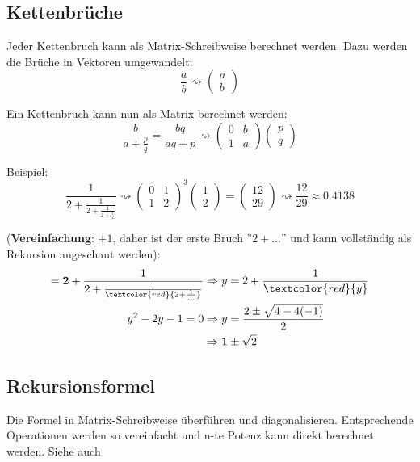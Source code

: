 \subsection{Kettenbrüche}
Jeder Kettenbruch kann als Matrix-Schreibweise berechnet werden. Dazu werden die Brüche in Vektoren umgewandelt:
\[
\frac{a}{b} \rightsquigarrow \begin{pmatrix} a \\ b \end{pmatrix}
\]

\noindent Ein Kettenbruch kann nun als Matrix berechnet werden:
\[
\frac{b}{a + \frac{p}{q}} = \frac{bq}{aq + p} \rightsquigarrow \begin{pmatrix}0 & b \\ 1 & a\end{pmatrix}\begin{pmatrix}p \\ q \end{pmatrix}
\]

\noindent Beispiel: 
\[
\frac{1}{2 + \frac{1}{2 + \frac{1}{2 + \frac{1}{2}}}} \rightsquigarrow
\begin{pmatrix}0 & 1 \\ 1 & 2 \end{pmatrix}^3\begin{pmatrix}1 \\ 2 \end{pmatrix} = \begin{pmatrix}12 \\ 29\end{pmatrix} \rightsquigarrow \frac{12}{29} \approx 0.4138
\]

\noindent(\textbf{Vereinfachung}: $+1$, daher ist der erste Bruch ''$2  + \dots$'' und kann vollständig als Rekursion angeschaut werden):
\begin{align*}
	 [1; 2,2,2, \dots, 2] = \textbf{2} + \frac{1}{2 + \frac{1}{\textcolor{red}{2 + \frac{1}{\dots}}}} &\Rightarrow y = 2 + \frac{1}{\textcolor{red}{y}} \\
	 y^2 - 2y - 1 = 0 &\Rightarrow y = \frac{2\pm\sqrt{4 - 4 (-1)}}{2}\\
	 &\Rightarrow \textbf{1} \pm \sqrt{2}
\end{align*}


\subsection{Rekursionsformel}
Die Formel in Matrix-Schreibweise überführen und diagonalisieren. Entsprechende Operationen werden so vereinfacht und n-te Potenz kann direkt berechnet werden. Siehe auch  \\

